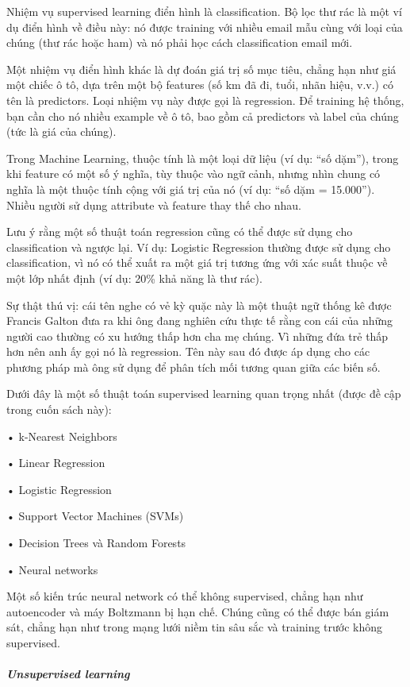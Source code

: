 Nhiệm vụ supervised learning điển hình là classification. Bộ lọc thư rác là một ví dụ điển hình về điều này: nó được training với nhiều email mẫu cùng với loại của chúng (thư rác hoặc ham) và nó phải học cách classification email mới.

Một nhiệm vụ điển hình khác là dự đoán giá trị số mục tiêu, chẳng hạn như giá một chiếc ô tô, dựa trên một bộ features (số km đã đi, tuổi, nhãn hiệu, v.v.) có tên là predictors. Loại nhiệm vụ này được gọi là regression. Để training hệ thống, bạn cần cho nó nhiều example về ô tô, bao gồm cả predictors và label của chúng (tức là giá của chúng).

Trong Machine Learning, thuộc tính là một loại dữ liệu (ví dụ: “số dặm”), trong khi feature có một số ý nghĩa, tùy thuộc vào ngữ cảnh, nhưng nhìn chung có nghĩa là một thuộc tính cộng với giá trị của nó (ví dụ: “số dặm = 15.000”). Nhiều người sử dụng attribute và feature thay thế cho nhau.

Lưu ý rằng một số thuật toán regression cũng có thể được sử dụng cho classification và ngược lại. Ví dụ: Logistic Regression thường được sử dụng cho classification, vì nó có thể xuất ra một giá trị tương ứng với xác suất thuộc về một lớp nhất định (ví dụ: 20\% khả năng là thư rác).

Sự thật thú vị: cái tên nghe có vẻ kỳ quặc này là một thuật ngữ thống kê được Francis Galton đưa ra khi ông đang nghiên cứu thực tế rằng con cái của những người cao thường có xu hướng thấp hơn cha mẹ chúng. Vì những đứa trẻ thấp hơn nên anh ấy gọi nó là regression. Tên này sau đó được áp dụng cho các phương pháp mà ông sử dụng để phân tích mối tương quan giữa các biến số.

Dưới đây là một số thuật toán supervised learning quan trọng nhất (được đề cập trong cuốn sách này):

• k-Nearest Neighbors

• Linear Regression

• Logistic Regression

• Support Vector Machines (SVMs)

• Decision Trees và Random Forests

• Neural networks

Một số kiến ​​trúc neural network có thể không supervised, chẳng hạn như autoencoder và máy Boltzmann bị hạn chế. Chúng cũng có thể được bán giám sát, chẳng hạn như trong mạng lưới niềm tin sâu sắc và training trước không supervised.

\subparagraph{Unsupervised learning}

